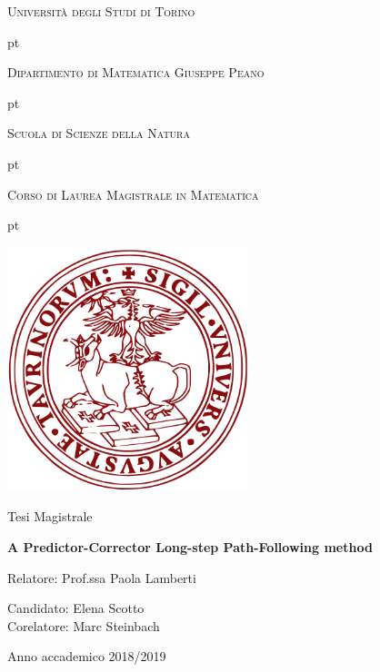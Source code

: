 \documentclass[a4paper,10 pt,titlepage,twoside]{book}
\theoremstyle{plain}
\theoremstyle{definition}
\theoremstyle{remark}
\begin{document}
\thispagestyle{empty}

\centerline {\huge{\textsc{Università degli Studi di Torino}}}
 pt

\centerline {\Large{\textsc{Dipartimento di Matematica Giuseppe Peano}}}

 pt

\centerline {\Large{\textsc{Scuola di Scienze della Natura}}}

 pt

\centerline {\Large{\textsc{Corso di Laurea Magistrale in Matematica}}}


 pt





\centerline {\includegraphics[width=7cm]{logo.jpg}}
\vskip 1.2cm
\centerline {\normalsize {Tesi Magistrale}} 

\vskip 0.7cm

\centerline {\Large {\bf A Predictor-Corrector Long-step Path-Following method}}

\vskip 1.7cm

\noindent Relatore: Prof.ssa Paola Lamberti

\hfill  {Candidato: Elena Scotto }\\
\noindent Corelatore: Marc Steinbach


\vskip 2.7cm


\centerline{Anno accademico 2018/2019}

\tableofcontents

% 
%
\end{document}
